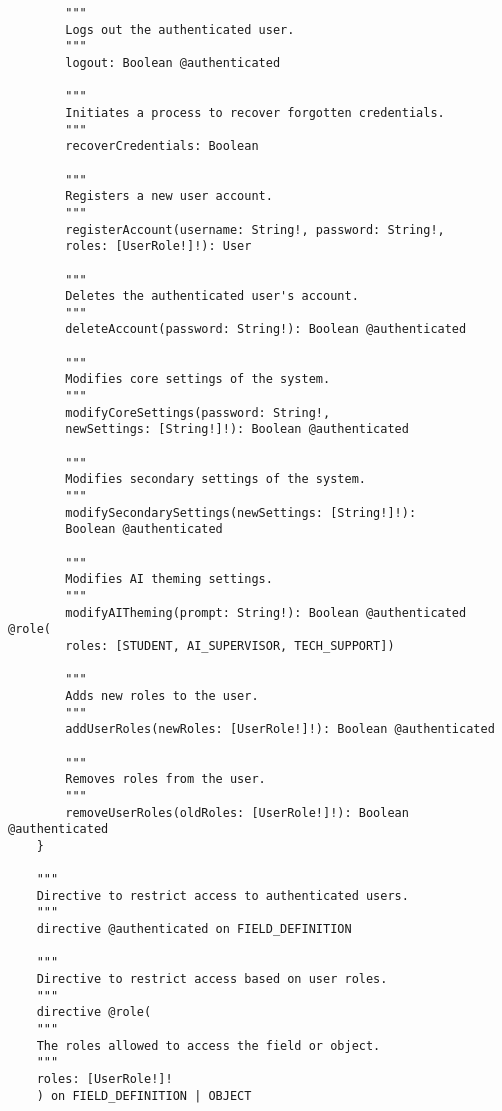 \begin{verbatim}
		"""
		Logs out the authenticated user.
		"""
		logout: Boolean @authenticated
		
		"""
		Initiates a process to recover forgotten credentials.
		"""
		recoverCredentials: Boolean
		
		"""
		Registers a new user account.
		"""
		registerAccount(username: String!, password: String!, 
		roles: [UserRole!]!): User
		
		"""
		Deletes the authenticated user's account.
		"""
		deleteAccount(password: String!): Boolean @authenticated
		
		"""
		Modifies core settings of the system.
		"""
		modifyCoreSettings(password: String!, 
		newSettings: [String!]!): Boolean @authenticated
		
		"""
		Modifies secondary settings of the system.
		"""
		modifySecondarySettings(newSettings: [String!]!): 
		Boolean @authenticated
		
		"""
		Modifies AI theming settings.
		"""
		modifyAITheming(prompt: String!): Boolean @authenticated @role(
		roles: [STUDENT, AI_SUPERVISOR, TECH_SUPPORT])
		
		"""
		Adds new roles to the user.
		"""
		addUserRoles(newRoles: [UserRole!]!): Boolean @authenticated
		
		"""
		Removes roles from the user.
		"""
		removeUserRoles(oldRoles: [UserRole!]!): Boolean @authenticated
	}
	
	"""
	Directive to restrict access to authenticated users.
	"""
	directive @authenticated on FIELD_DEFINITION
	
	"""
	Directive to restrict access based on user roles.
	"""
	directive @role(
	"""
	The roles allowed to access the field or object.
	"""
	roles: [UserRole!]!
	) on FIELD_DEFINITION | OBJECT 
\end{verbatim}

